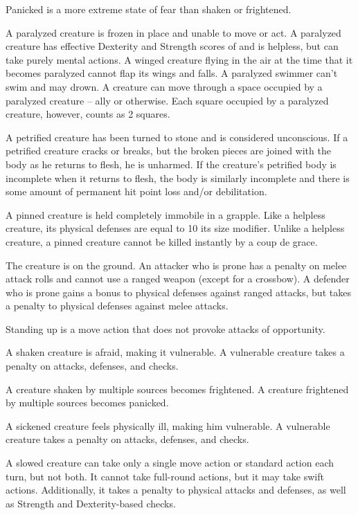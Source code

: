 Panicked is a more extreme state of fear than shaken or frightened.

 A paralyzed creature is frozen in place and unable to move or act. A paralyzed creature has effective Dexterity and Strength scores of  and is helpless, but can take purely mental actions. A winged creature flying in the air at the time that it becomes paralyzed cannot flap its wings and falls. A paralyzed swimmer can't swim and may drown. A creature can move through a space occupied by a paralyzed creature -- ally or otherwise. Each square occupied by a paralyzed creature, however, counts as 2 squares.

 A petrified creature has been turned to stone and is considered unconscious. If a petrified creature cracks or breaks, but the broken pieces are joined with the body as he returns to flesh, he is unharmed. If the creature's petrified body is incomplete when it returns to flesh, the body is similarly incomplete and there is some amount of permanent hit point loss and/or debilitation.

 A pinned creature is held completely immobile in a grapple. Like a helpless creature, its physical defenses are equal to 10 \add its size modifier. Unlike a helpless creature, a pinned creature cannot be killed instantly by a coup de grace.

 The creature is on the ground. An attacker who is prone has a  penalty on melee attack rolls and cannot use a ranged weapon (except for a crossbow). A defender who is prone gains a  bonus to physical defenses against ranged attacks, but takes a  penalty to physical defenses against melee attacks.

Standing up is a move action that does not provoke attacks of opportunity.

 A shaken creature is afraid, making it vulnerable. A vulnerable creature takes a  penalty on attacks, defenses, and checks.

A creature shaken by multiple sources becomes frightened. A creature frightened by multiple sources becomes panicked.

 A sickened creature feels physically ill, making him vulnerable. A vulnerable creature takes a  penalty on attacks, defenses, and checks.

 A slowed creature can take only a single move action or standard action each turn, but not both. It cannot take full-round actions, but it may take swift actions. Additionally, it takes a  penalty to physical attacks and defenses, as well as Strength and Dexterity-based checks.

